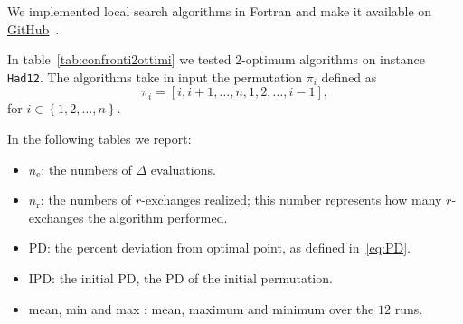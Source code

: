 We implemented local search algorithms in Fortran and make it available on \href{https://github.com/Tommaso-Mannelli-Mazzoli/QAP/blob/master/local_search.f90}{GitHub}~\cite{Mazzoli2020}.

In table~\ref{tab:confronti2ottimi} we tested $2$-optimum algorithms on instance \texttt{Had12}. The algorithms take in input the permutation $\pi_i$ defined as 
\[
\pi_i = \left[i,i+1,\dots,n,1,2,\dots,i-1\right],  
\]
for $i \in \left\{1,2,\dots,n\right\}$. 


In the following tables we report:
\begin{itemize}
	\item $n_\mathrm{e}$: the numbers of $\Delta$ evaluations.
	\item $n_\mathrm{r}$: the numbers of $r$-exchanges realized; this number represents how many $r$-exchanges the algorithm performed.
	\item PD: the percent deviation from optimal point, as defined in~\eqref{eq:PD}.
	\item IPD: the  initial PD, the PD of the initial permutation.
	\item mean, min and max : mean, maximum and minimum over the $12$ runs.
\end{itemize}


